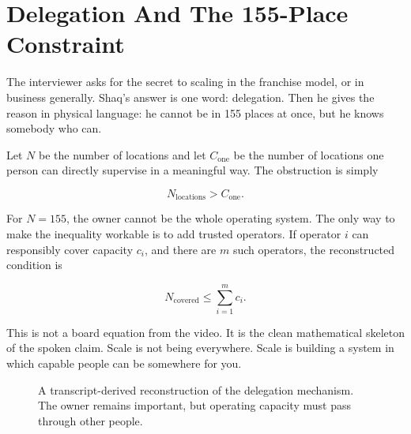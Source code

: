 \section{Delegation And The 155-Place Constraint}

The interviewer asks for the secret to scaling in the franchise model, or in business generally. Shaq's answer is one word: delegation. Then he gives the reason in physical language: he cannot be in 155 places at once, but he knows somebody who can.

Let \(N\) be the number of locations and let \(C_{\mathrm{one}}\) be the number of locations one person can directly supervise in a meaningful way. The obstruction is simply

\begin{equation}
N_{\mathrm{locations}} > C_{\mathrm{one}}.
\end{equation}

For \(N=155\), the owner cannot be the whole operating system. The only way to make the inequality workable is to add trusted operators. If operator \(i\) can responsibly cover capacity \(c_i\), and there are \(m\) such operators, the reconstructed condition is

\begin{equation}
N_{\mathrm{covered}} \leq \sum_{i=1}^{m} c_i.
\end{equation}

This is not a board equation from the video. It is the clean mathematical skeleton of the spoken claim. Scale is not being everywhere. Scale is building a system in which capable people can be somewhere for you.

\begin{figure}
\centering
{}
\caption{A transcript-derived reconstruction of the delegation mechanism. The owner remains important, but operating capacity must pass through other people.}
\end{figure}

